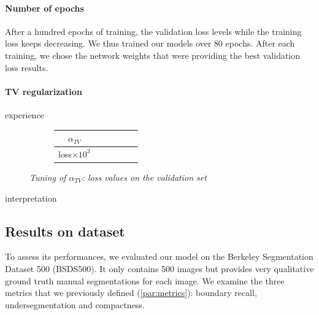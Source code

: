 \documentclass{article}
\begin{document}
        \paragraph{Number of epochs}
        After a hundred epochs of training, the validation loss levels while the training loss keeps decreasing. We thus trained our models over 80 epochs. After each training, we chose the network weights that were providing the best validation loss results.

        \paragraph{TV regularization}
            experience \cite{todo:tv-tuning}

            \begin{figure}[!ht]
                \begin{subfigure}{.49\linewidth}
                    \centering
                    \begin{tabular}{|c|c|c|c|c|c|}
                        \hline
                        $\alpha_{TV}$ &   &   &   &   &   \\
                        \hline \hline
                        loss$\times 10^3$ &   &   &   &   &  \\
                        \hline
                    \end{tabular}
                \end{subfigure}
                \begin{subfigure}{.49\linewidth}
                    \centering
                \end{subfigure}
                \caption{\textit{Tuning of $\alpha_{TV}$: loss values on the validation set}}
            \end{figure}
            \par
            interpretation \cite{toto:tv-interpretation}

    \subsection{Results on dataset}

        To assess its performances, we evaluated our model on the Berkeley Segmentation Dataset 500 (BSDS500)\cite{arbelaez2011}. It only contains 500 images but provides very qualitative ground truth manual segmentations for each image. We examine the three metrics that we previously defined (\ref{par:metrics}): boundary recall, undersegmentation and compactness.
\end{document}
